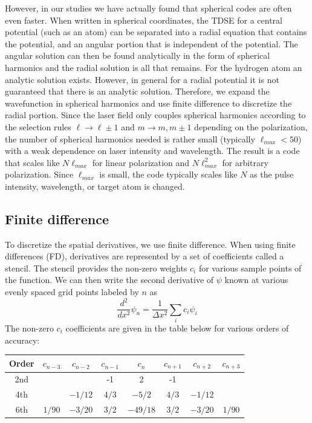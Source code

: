 However, in our studies we have actually found that spherical codes are often even faster. When written in spherical coordinates, the TDSE for a central potential (such as an atom) can be separated into a radial equation that contains the potential, and an angular portion that is independent of the potential. The angular solution can then be found analytically in the form of spherical harmonics and
the radial solution is all that remains. For the hydrogen atom an analytic solution exists. However, in general for a radial potential it is not guaranteed that there is an analytic solution. Therefore, we expand the wavefunction in spherical harmonics and use finite difference to discretize the radial portion. Since the laser field only couples spherical harmonics according to the selection rules $\ell \rightarrow \ell \pm1$ and $m \rightarrow m, m\pm1$ depending on the polarization, the number of spherical harmonics needed is rather small (typically $\ell_{max}<50$) with a weak dependence on laser intensity and wavelength. The result is a code that scales like $N\ell_{max}$ for linear polarization and $N\ell_{max}^2$ for arbitrary polarization. Since $\ell_{max}$ is small, the code typically scales like $N$ as the pulse intensity, wavelength, or target atom is changed.

\subsection{Finite difference} %
\label{sub:finite_difference}
To discretize the spatial derivatives, we use finite difference. When using finite differences (FD), derivatives are represented by a set of coefficients called a stencil. The stencil provides the non-zero weights $c_i$ for various sample points of the function. We can then write the second derivative of $\psi$ known at various evenly spaced grid points labeled by $n$ as
\begin{equation}
    \frac{d^2}{dx^2}\psi_n = \frac{1}{\Delta x^2}\sum_i c_i \psi_i
    \label{eq:finite_diff}
\end{equation}
The non-zero $c_i$ coefficients are given in the table below for various orders of accuracy:
\begin{center}
\begin{tabular}{ |c|c|c|c|c|c|c|c| }
\hline
Order & $c_{n-3}$ & $c_{n-2}$ & $c_{n-1}$ & $c_{n}$ & $c_{n+1}$ & $c_{n+2}$ & $c_{n+3}$ \\ \hline
2nd   &      &      & -1   & 2  & -1   &      &      \\ \hline
4th   &      & $-1/12$ & $4/3$   & $-5/2$  & $4/3$   &  $-1/12$    &      \\ \hline
6th   &   $1/90$   &  $-3/20$    & $3/2$   & $-49/18$  & $3/2$   &   $-3/20$    &   $1/90$  \\ \hline
\end{tabular}
\end{center}

